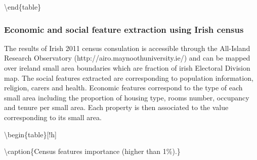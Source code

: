 \documentclass[]{elsarticle} %
\begin{document}
\textbackslash{}end\{table\}

\subsubsection{Economic and social feature extraction using Irish
census}\label{economic-and-social-feature-extraction-using-irish-census}

The results of Irish 2011 census consulation is accessible through the
All-Island Research Observatory (http://airo.maynoothuniversity.ie/) and
can be mapped over ireland small area boundaries which are fraction of
irish Electoral Division map. The social features extracted are
corresponding to population information, religion, carers and health.
Economic features correspond to the type of each small area including
the proportion of housing type, rooms number, occupancy and tenure per
small area. Each property is then associated to the value corresponding
to its small area.

\textbackslash{}begin\{table\}{[}!h{]}

\textbackslash{}caption\{\label{tab:AIRO_features}Census features
importance (higher than 1\%).\} \centering
\fontsize{8}{10}\selectfont
\end{document}
